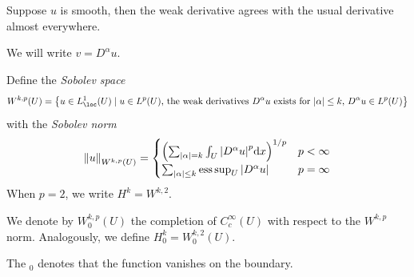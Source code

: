 \documentclass{article}
\begin{document}
Suppose \(u\) is smooth, then the weak derivative agrees with the usual derivative almost everywhere.

\begin{notation}
    We will write \(v = D^\alpha u\).
\end{notation}

\begin{definition}
     Define the \emph{Sobolev space}
    \[W^{k, p}(U) = \left\{u \in L^1_\loc(U) \mid u \in L^p(U) \text{, the weak derivatives }D^\alpha u\text{ exists for }\abs{\alpha} \le k\text{, }D^\alpha u \in L^p(U)\right\}\]
    with the \emph{Sobolev norm}
    \[\norm{u}_{W^{k,p}(U)} = \begin{cases}
        \left(\sum_{\abs{\alpha} = k}\int_U\abs{D^\alpha u}^p \dd x\right)^{1/p} & p < \infty \\
        \sum_{\abs{\alpha} \le k}\operatorname*{ess\,sup}_U \abs{D^\alpha u} & p = \infty
    \end{cases}\]
    When \(p = 2\), we write \(H^k = W^{k, 2}\).
\end{definition}

\begin{definition}
    [\(W_0^{k, p}\)]
    We denote by \(W^{k, p}_0(U)\) the completion of \(C_c^\infty(U)\) with respect to the \(W^{k,p}\) norm. Analogously, we define \(H^k_0 = W^{k, 2}_0(U)\).
\end{definition}

The \(_0\) denotes that the function vanishes on the boundary.

\lec
\end{document}
